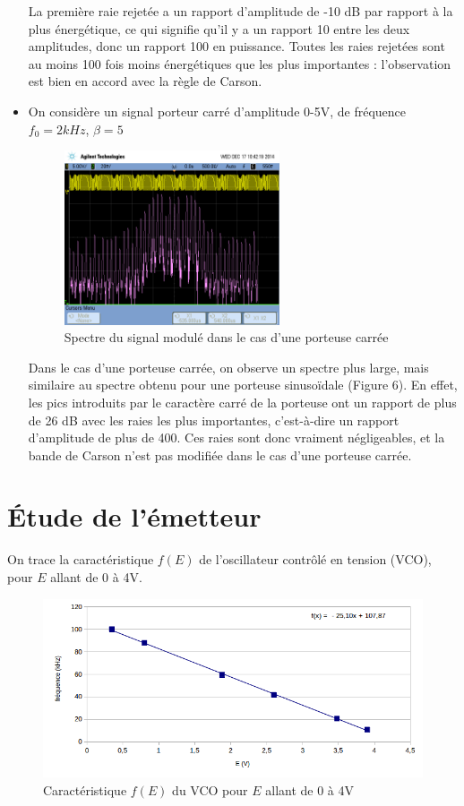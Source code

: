 \documentclass[../../Cours_M1.tex]{subfiles}
\begin{document}
\begin{itemize}
La première raie rejetée a un rapport d'amplitude de -10 dB par rapport à la plus énergétique, ce qui signifie qu'il y a un rapport 10 entre les deux amplitudes, donc un rapport 100 en puissance. Toutes les raies rejetées sont au moins 100 fois moins énergétiques que les plus importantes : l'observation est bien en accord avec la règle de Carson.

\item On considère un signal porteur carré d'amplitude 0-5V, de fréquence $f_0=2kHz$, $\beta = 5$
\begin{figure}[h!]
\centering
\includegraphics[width=0.6\textwidth]{porteusecarree.png}
\caption{Spectre du signal modulé dans le cas d'une porteuse carrée}
\end{figure}

Dans le cas d'une porteuse carrée, on observe un spectre plus large, mais similaire au spectre obtenu pour une porteuse sinusoïdale (Figure 6). En effet, les pics introduits par le caractère carré de la porteuse ont un rapport de plus de 26 dB avec les raies les plus importantes, c'est-à-dire un rapport d'amplitude de plus de 400. Ces raies sont donc vraiment négligeables, et la bande de Carson n'est pas modifiée dans le cas d'une porteuse carrée.
\end{itemize}

\section{Étude de l'émetteur}

On trace la caractéristique $f(E)$ de l'oscillateur contrôlé en tension (VCO), pour $E$ allant de 0 à 4V.

\begin{figure}[h!]
\centering
\includegraphics[width=\textwidth]{f(E).png}
\caption{Caractéristique $f(E)$ du VCO pour $E$ allant de 0 à 4V}
\end{figure}
\end{document}
